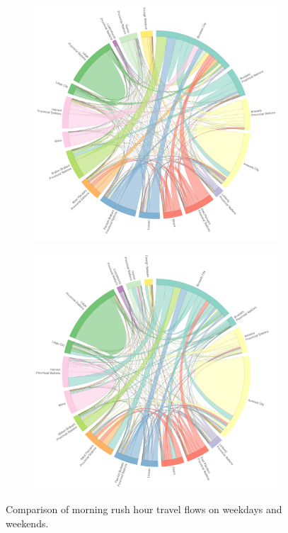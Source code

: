 \documentclass{sig-alternate}
\begin{document}
\begin{figure}
  \centering
  \begin{subfigure}{1\textwidth}
    \centering
    \includegraphics[width=13cm]{weekdays_morning.pdf}\\
    \label{fig:weekdays_morning}
  \end{subfigure}
  \begin{subfigure}{1\textwidth}
    \centering
    \includegraphics[width=13cm]{weekends_morning.pdf}\\
    \label{fig:weekends_morning}
  \end{subfigure}
  \caption{Comparison of morning rush hour travel flows on weekdays and weekends.}
  \label{fig:mornings}
\end{figure}
\end{document}
